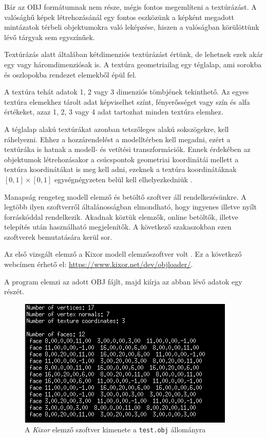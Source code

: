
Bár az OBJ formátumnak nem része, mégis fontos megemlíteni a textúrázást. A valósághű képek létrehozásánál egy fontos eszközünk a képként megadott mintázatok térbeli objektumokra való leképzése, hiszen a valóságban körülöttünk lévő tárgyak sem egyszínűek.

Textúrázás alatt általában kétdimenziós textúrázást értünk, de lehetnek ezek akár egy vagy háromdimenziósak is. A textúra geometriailag egy téglalap, ami sorokba és oszlopokba rendezet elemekből épül fel.

A textúra tehát adatok 1, 2 vagy 3 dimenziós tömbjének tekinthető. Az egyes textúra elemekhez tárolt adat képviselhet színt, fényerősséget vagy szín és alfa értékeket, azaz 1, 2, 3 vagy 4 adat  tartozhat minden textúra elemhez.

A téglalap alakú textúrákat azonban tetszőleges alakú sokszögekre, kell ráhelyezni. Ehhez a hozzárendelést a modelltérben kell megadni, ezért  a textúráka is hatnak a modell- és vetítési transzformációk. Ennek érdekében az objektumok létrehozásakor a csúcspontok geometriai koordinátái mellett a textúra koordinátákat is meg kell adni, ezeknek a textúra koordinátáknak $[0, 1] \times [0, 1]$ egységnégyzeten belül kell elhelyezkedniük \cite{juhasz2003opengl}.


Manapság rengeteg modell elemző és betöltő szoftver áll rendelkezésünkre. A legtöbb ilyen szoftverről általánosságban elmondható, hogy ingyenes illetve  nyílt forráskóddal rendelkezik. Akadnak köztük elemzők, online betöltők, illetve telepítés után használható megjelenítők. A következő szakaszokban ezen szoftverek bemutatására kerül sor.


Az első vizsgált elemző a Kixor modell elemzőszoftver volt \cite{micah1987markup}.
Ez a következő webcímen érhető el: \url{https://www.kixor.net/dev/objloader/}.

A program elemzi az adott OBJ fájlt, majd kiírja az abban lévő adatok egy részét.

\begin{figure}[h]
\centering
\includegraphics[scale=0.8]{images/kixor.png}
\caption{A \textit{Kixor} elemző szoftver kimenete a \texttt{test.obj} állományra}
\label{fig:kixor}
\end{figure}
\bigskip

